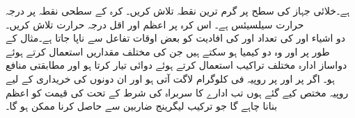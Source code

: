 ہے۔خلائی  جہاز کی  سطح پر گرم ترین نقطہ تلاش کریں۔
کرہ   کے سطحی نقطہ  پر درجہ حرارت   سیلسیئس ہے۔ اس کرہ پر اعظم اور  اقل  درجہ حرارت تلاش کریں۔
\\
دو   اشیاء  اور  کی تعداد  اور  کی افادیت   کو بعض اوقات تفاعل   سے ناپا جاتا ہے۔مثال کے طور پر  اور  وہ دو   کیمیا ہو سکتے ہیں جن کی مختلف مقداریں  استعمال کرتے ہوئے    دواساز ادارہ  مختلف  تراکیب   استعمال  کرتے ہوئے    دوائی تیار کرتا  ہو اور مطابقتی  منافع  ہو۔ اگر   پر  اور  پر  روپیہ فی کلوگرام لاگت آتی ہو اور ان دونوں کی خریداری کے لیے   روپیہ مختص کیے  گئے ہوں تب ادارے  کا سربراہ  کی شرط کے تحت    کی قیمت کو اعظم بنانا چاہے گا جو  ترکیب لیگرینج ضاربین سے حاصل کرنا ممکن ہو گا۔


